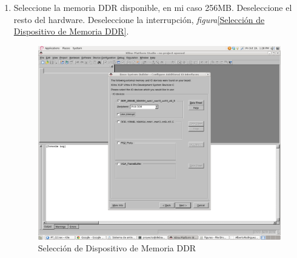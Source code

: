 \begin{enumerate}
  
\item Seleccione la memoria DDR disponible, en mi caso 256MB. Deseleccione el
resto del hardware. Deseleccione la interrupción,  \emph{figura}\ref{Selección
de Dispositivo de Memoria DDR}.
  \begin{figure}[h!] 
  \centering
  \includegraphics[scale=.25]{./figuras/EDK8.png}
  \caption{Selección de Dispositivo de Memoria DDR}
  \label{Selección de Dispositivo de Memoria DDR}
  \end{figure}
  

\end{enumerate}
